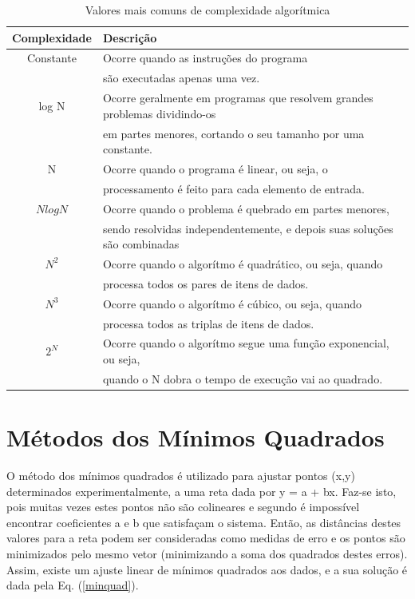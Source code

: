 \begin{table}[h]
	\centering	
	\begin{tabular}{cl}
		\toprule
		\textbf{Complexidade} & \textbf{Descrição}  \\
		\midrule
		Constante &  Ocorre quando as instruções do programa \\
		 &  são executadas apenas uma vez.\\
		log N & Ocorre geralmente em programas que resolvem grandes problemas dividindo-os \\
		 &  em partes menores, cortando o seu tamanho por uma constante.  \\
		N & Ocorre quando o programa é linear, ou seja, o \\ 
		 &  processamento é feito para cada elemento de entrada. \\
		$ N log N$ & Ocorre quando o problema é quebrado em partes menores, \\
		 &  sendo resolvidas independentemente, e depois suas soluções são combinadas \\
		$ N^{2}$ & Ocorre quando o algorítmo é quadrático, ou seja, quando \\
		 &  processa todos os pares de itens de dados. \\
		$ N^{3}$ & Ocorre quando o algorítmo é cúbico, ou seja, quando \\
		 &  processa todos as triplas de itens de dados. \\
		$ 2^{N}$ & Ocorre quando o algorítmo segue uma função exponencial, ou seja, \\
		 &  quando o N dobra o tempo de execução vai ao quadrado. \\
	
		\bottomrule
	\end{tabular}
	\caption{ Valores mais comuns de complexidade algorítmica}
	\label{complexidadeAlgoritmica}
\end{table}


\section{Métodos dos Mínimos Quadrados}


	O método dos mínimos quadrados é utilizado para ajustar pontos (x,y) determinados experimentalmente, a uma reta dada por y = a + bx. Faz-se isto, pois muitas vezes estes pontos não são colineares e segundo \cite{minq} é impossível encontrar coeficientes a e b que satisfaçam o sistema. Então, as distâncias destes valores para a reta podem ser consideradas como medidas de erro e os pontos são minimizados pelo mesmo vetor (minimizando a soma dos quadrados destes erros).  Assim, existe um ajuste linear de mínimos quadrados aos dados, e a sua solução é dada pela Eq. (\ref{minquad}).

